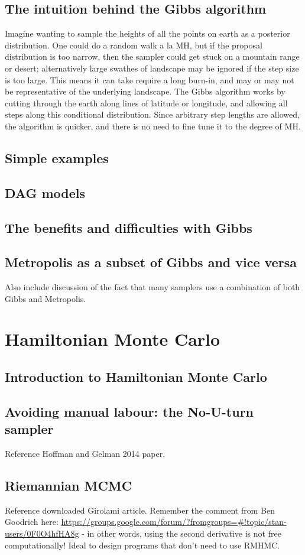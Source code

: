 \documentclass[11pt,fullpage]{book}
\begin{document}
\section{The intuition behind the Gibbs algorithm}
Imagine wanting to sample the heights of all the points on earth as a posterior distribution. One could do a random walk a la MH, but if the proposal distribution is too narrow, then the sampler could get stuck on a mountain range or desert; alternatively large swathes of landscape may be ignored if the step size is too large. This means it can take require a long burn-in, and may or may not be representative of the underlying landscape. The Gibbs algorithm works by cutting through the earth along lines of latitude or longitude, and allowing all steps along this conditional distribution. Since arbitrary step lengths are allowed, the algorithm is quicker, and there is no need to fine tune it to the degree of MH.

\section{Simple examples}
\section{DAG models}
\section{The benefits and difficulties with Gibbs}
\section{Metropolis as a subset of Gibbs and vice versa}
Also include discussion of the fact that many samplers use a combination of both Gibbs and Metropolis.


\chapter{Hamiltonian Monte Carlo}\label{chap:HMC}
\section{Introduction to Hamiltonian Monte Carlo}
\section{Avoiding manual labour: the No-U-turn sampler}
Reference Hoffman and Gelman 2014 paper.
\section{Riemannian MCMC}
Reference downloaded Girolami article.
Remember the comment from Ben Goodrich here: \url{https://groups.google.com/forum/?fromgroups=#!topic/stan-users/0F0O4hfHA8g} - in other words, using the second derivative is not free computationally! Ideal to design programs that don't need to use RMHMC.
\end{document}
